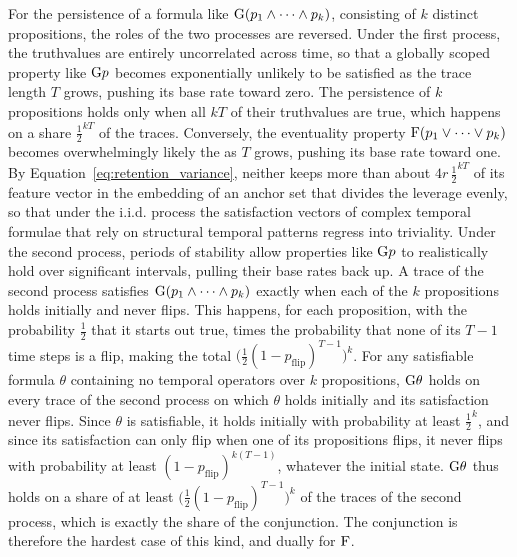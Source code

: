 \documentclass[titlepage,a4paper,11pt]{report}
\begin{document}
    For the persistence of a formula like $\text{G}(p_1\land\dots\land p_k)$, consisting of $k$ distinct propositions, the roles of the two processes are reversed. Under the first process, the truthvalues are entirely uncorrelated across time, so that a globally scoped property like $\text{G} p$ becomes exponentially unlikely to be satisfied as the trace length $T$ grows, pushing its base rate toward zero. The persistence of $k$ propositions holds only when all $kT$ of their truthvalues are true, which happens on a share $\frac12^{kT}$ of the traces. Conversely, the eventuality property $\text{F}(p_1\lor\dots\lor p_k)$ becomes overwhelmingly likely the as $T$ grows, pushing its base rate toward one. By Equation~\eqref{eq:retention_variance}, neither keeps more than about $4r\,\frac12^{kT}$ of its feature vector in the embedding of an anchor set that divides the leverage evenly, so that under the i.i.d. process the satisfaction vectors of complex temporal formulae that rely on structural temporal patterns regress into triviality. Under the second process, periods of stability allow properties like $\text{G} p$ to realistically hold over significant intervals, pulling their base rates back up. A trace of the second process satisfies $\text{G}(p_1\land\dots\land p_k)$ exactly when each of the $k$ propositions holds initially and never flips. This happens, for each proposition, with the probability $\frac12$ that it starts out true, times the probability that none of its $T-1$ time steps is a flip, making the total $\bigl(\frac12(1-p_{\text{flip}})^{T-1}\bigr)^k$. For any satisfiable formula $\theta$ containing no temporal operators over $k$ propositions, $\text{G}\theta$ holds on every trace of the second process on which $\theta$ holds initially and its satisfaction never flips. Since $\theta$ is satisfiable, it holds initially with probability at least $\frac12^{k}$, and since its satisfaction can only flip when one of its propositions flips, it never flips with probability at least $(1-p_{\text{flip}})^{k(T-1)}$, whatever the initial state. $\text{G}\theta$ thus holds on a share of at least $\bigl(\frac12(1-p_{\text{flip}})^{T-1}\bigr)^k$ of the traces of the second process, which is exactly the share of the conjunction. The conjunction is therefore the hardest case of this kind, and dually for $\text{F}$.
\end{document}

